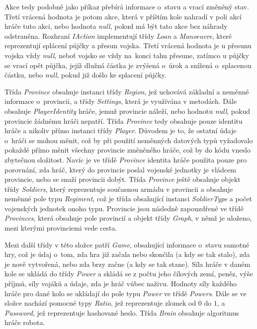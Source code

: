 \documentclass[a4paper,12pt]{article}
\begin{document}
Akce tedy podobně jako příkaz přebírá informace o~stavu a vrací změněný stav. Třetí vrácená hodnota je potom akce, která v příštím kole nahradí v poli akcí hráče tuto akci, nebo hodnota \textit{null}, pokud má být tato akce bez náhrady odstraněna. Rozhraní \textit{IAction} implementují třídy \textit{Loan} a \textit{Manoeuvre}, které reprezentují splácení půjčky a přesun vojska. Třetí vrácená hodnota je u přesunu vojska vždy \textit{null}, neboť vojsko se vždy na~konci tahu přesune, zatímco u půjčky se vrací opět půjčka, jejíž dlužná částka je zvýšená o~úrok a snížená o~splacenou částku, nebo \textit{null}, pokud již došlo ke splacení půjčky.

Třída \textit{Province} obsahuje instanci třídy \textit{Region}, jež uchovává základní a neměnné informace o~provincii, a třídy \textit{Settings}, která je využívána v metodách. Dále obsahuje \textit{PlayerIdentity} hráče, jemuž provincie náleží, nebo hodnotu \textit{null}, pokud provincie žádnému hráči nepatří. Třída \textit{Province} tedy obsahuje pouze identitu hráče a nikoliv přímo instanci třídy \textit{Player}. Důvodem je to, že ostatní údaje o~hráči se mohou měnit, což by při použití neměnných datových typů vyžadovalo pokaždé přímo měnit všechny provincie změněného hráče, což by do kódu vneslo zbytečnou složitost. Navíc je ve třídě \textit{Province} identita hráče použita pouze pro porovnání, zda hráč, který do provincie poslal vojenské jednotky je vládcem provincie, nebo se snaží provincii dobýt. Třída \textit{Province} ještě obsahuje objekt třídy \textit{Soldiers}, který reprezentuje současnou armádu v provincii a obsahuje neměnné pole typu \textit{Regiment}, což je třída obsahující instanci \textit{SoldierType} a počet vojenských jednotek onoho typu. Provincie jsou následně zapouzdřené ve třídě \textit{Provinces}, která obsahuje pole provincií a objekt třídy \textit{Graph}, v němž je uloženo, mezi kterými provinciemi vede cesta.

Mezi další třídy v této složce patří \textit{Game}, obsahující informace o~stavu samotné hry, což je údaj o~tom, zda hra již začala nebo skončila (a kdy se tak stalo), zda je nově vytvořená, nebo zda brzy začne (a kdy se tak stane). Síla hráče v daném kole se ukládá do třídy \textit{Power} a skládá se z počtu jeho čílových zemí, peněz, výše příjmů, síly vojáků a údaje, zda je hráč vůbec naživu. Hodnoty síly každého hráče pro dané kolo se ukládají do pole typu \textit{Power} ve třídě \textit{Powers}. Dále se ve složce nachází pomocné typy \textit{Ratio}, jež reprezentuje zlomek od $0$ do $1$, a \textit{Password}, jež reprezentuje hashované heslo. Třída \textit{Brain} obsahuje algoritmus hráče robota.
\end{document}
